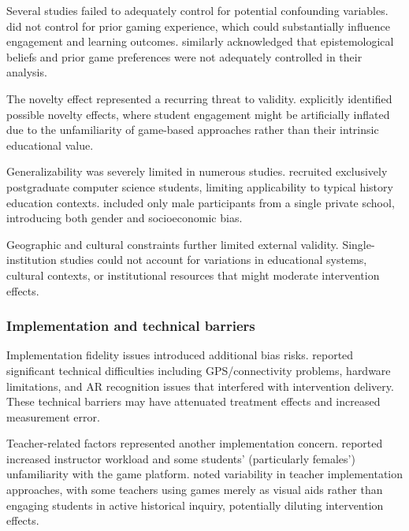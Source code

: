 \documentclass[a4paper,fleqn]{cas-sc}
\begin{document}
Several studies failed to adequately control for potential confounding variables. \citet{8Yu2014} did not control for prior gaming experience, which could substantially influence engagement and learning outcomes. \citet{44Shiue2016} similarly acknowledged that epistemological beliefs and prior game preferences were not adequately controlled in their analysis.

The novelty effect represented a recurring threat to validity. \citet{47Clara2010156, 56Akkerman2009449} explicitly identified possible novelty effects, where student engagement might be artificially inflated due to the unfamiliarity of game-based approaches rather than their intrinsic educational value.

Generalizability was severely limited in numerous studies. \citet{6Czerwinski2018} recruited exclusively postgraduate computer science students, limiting applicability to typical history education contexts. \citet{12Gilbert2019108} included only male participants from a single private school, introducing both gender and socioeconomic bias.

Geographic and cultural constraints further limited external validity. Single-institution studies \citep{25Repantis2011502, 34Serrano2023, 46Stirling2022, 60Hoy2018, 78Rouse2022357} could not account for variations in educational systems, cultural contexts, or institutional resources that might moderate intervention effects.

\subsubsection{Implementation and technical barriers}

Implementation fidelity issues introduced additional bias risks. \citet{1Barbatsis201159, 49Huizenga2007127, 64Hsu201324, 69Wong2017150} reported significant technical difficulties including GPS/connectivity problems, hardware limitations, and AR recognition issues that interfered with intervention delivery. These technical barriers may have attenuated treatment effects and increased measurement error.

Teacher-related factors represented another implementation concern. \citet{8Yu2014} reported increased instructor workload and some students' (particularly females') unfamiliarity with the game platform. \citet{41Petersen2023301} noted variability in teacher implementation approaches, with some teachers using games merely as visual aids rather than engaging students in active historical inquiry, potentially diluting intervention effects.
\end{document}
